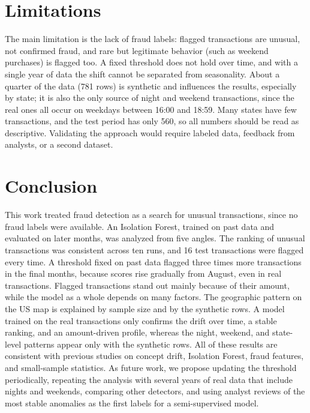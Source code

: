 \documentclass[journal]{IEEEtran}
\begin{document}

\section{Limitations}

The main limitation is the lack of fraud labels: flagged transactions are unusual, not confirmed fraud, and rare but legitimate behavior (such as weekend purchases) is flagged too. A fixed threshold does not hold over time, and with a single year of data the shift cannot be separated from seasonality. About a quarter of the data (781 rows) is synthetic and influences the results, especially by state; it is also the only source of night and weekend transactions, since the real ones all occur on weekdays between 16:00 and 18:59. Many states have few transactions, and the test period has only 560, so all numbers should be read as descriptive. Validating the approach would require labeled data, feedback from analysts, or a second dataset.


\section{Conclusion}

This work treated fraud detection as a search for unusual transactions, since no fraud labels were available. An Isolation Forest, trained on past data and evaluated on later months, was analyzed from five angles. The ranking of unusual transactions was consistent across ten runs, and 16 test transactions were flagged every time. A threshold fixed on past data flagged three times more transactions in the final months, because scores rise gradually from August, even in real transactions. Flagged transactions stand out mainly because of their amount, while the model as a whole depends on many factors. The geographic pattern on the US map is explained by sample size and by the synthetic rows. A model trained on the real transactions only confirms the drift over time, a stable ranking, and an amount-driven profile, whereas the night, weekend, and state-level patterns appear only with the synthetic rows. All of these results are consistent with previous studies on concept drift, Isolation Forest, fraud features, and small-sample statistics. As future work, we propose updating the threshold periodically, repeating the analysis with several years of real data that include nights and weekends, comparing other detectors, and using analyst reviews of the most stable anomalies as the first labels for a semi-supervised model.
\end{document}
